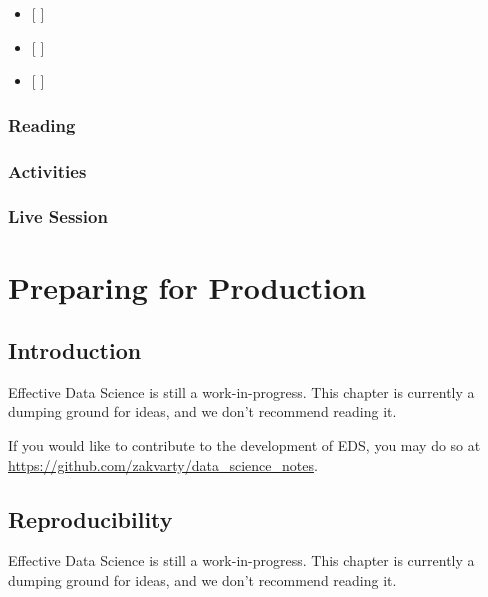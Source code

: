 \documentclass[
  12pt,
]{book}
\begin{document}
\begin{itemize}
\item
  {[} {]}
\item
  {[} {]}
\item
  {[} {]}
\end{itemize}

\hypertarget{reading-2}{%
\section{Reading}\label{reading-2}}

\hypertarget{activities}{%
\section{Activities}\label{activities}}

\hypertarget{live-session-2}{%
\section{Live Session}\label{live-session-2}}

\hypertarget{part-preparing-for-production}{%
\part{Preparing for Production}\label{part-preparing-for-production}}

\hypertarget{production-introduction}{%
\chapter*{Introduction}\label{production-introduction}}

Effective Data Science is still a work-in-progress. This chapter is currently a dumping ground for ideas, and we don't recommend reading it.

If you would like to contribute to the development of EDS, you may do so at \url{https://github.com/zakvarty/data_science_notes}.

\hypertarget{production-reproducibility}{%
\chapter{Reproducibility}\label{production-reproducibility}}

Effective Data Science is still a work-in-progress. This chapter is currently a dumping ground for ideas, and we don't recommend reading it.
\end{document}
